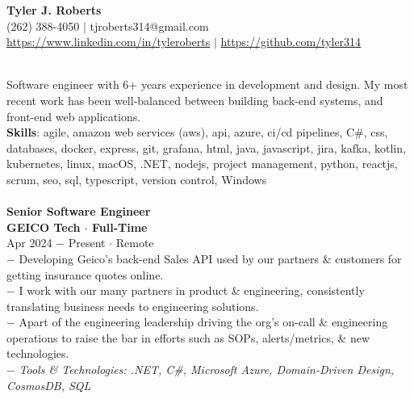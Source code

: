 \documentclass{resume}
\begin{document}
\begin{center}
{\LARGE \bf Tyler J. Roberts} \\[1mm]
\footnotesize
(262) 388-4050 $|$
tjroberts314@gmail.com \\[1mm]
\href{https://www.linkedin.com/in/tyleroberts}{https://www.linkedin.com/in/tyleroberts} $|$
\href{https://github.com/tyler314}{https://github.com/tyler314}
\end{center}
\begin{flushleft}

 \\[2mm]
{
	\scriptsize
	\tab Software engineer with 6+ years experience in  development and design. My most recent work has been well-balanced between building back-end systems, and front-end  web applications.\\[2mm]
	\scriptsize
	\textbf{Skills}: agile, amazon web services (aws), api, azure, ci/cd pipelines, C\#, css, databases, docker, express, git, grafana, html, java, javascript, jira, kafka, kotlin, kubernetes, linux, macOS, .NET, nodejs, project management, python, reactjs, scrum, seo, sql, typescript, version control, Windows
	\\[2mm]
}
\\[2mm]

\normalsize{\bf Senior Software Engineer}\\
\footnotesize{\bf GEICO Tech $\cdot$ Full-Time}\\
\footnotesize{Apr 2024 $-$ Present $\cdot$ Remote}\\[1mm]
{\scriptsize
	$-$ Developing Geico's back-end Sales API used by our partners \& customers for getting insurance quotes online.\\
	$-$ I work with our many partners in product \& engineering, consistently translating business needs to engineering solutions.\\
	$-$ Apart of the engineering leadership driving the org's on-call \& engineering operations to raise the bar in efforts such as SOPs, alerts/metrics, \& new technologies.\\
	$-$ \textit{Tools \& Technologies: .NET, C\#, Microsoft Azure, Domain-Driven Design, CosmosDB, SQL}
}\\[3mm]


\end{flushleft}
\end{document}
